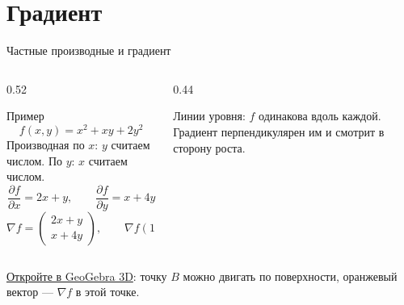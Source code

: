 \section{Градиент}

\begin{frame}[c,fragile]{Частные производные и градиент}
  \begin{columns}[T]
    \begin{column}{0.52\textwidth}
      \begin{block}{Пример}
        \small
        \[f(x, y) = x^2 + xy + 2y^2\]
        Производная по $x$: $y$ считаем числом. По $y$: $x$ считаем числом.
        \[\frac{\partial f}{\partial x} = 2x + y, \qquad \frac{\partial f}{\partial y} = x + 4y\]
        \[\nabla f = \begin{pmatrix} 2x+y\\ x+4y\end{pmatrix},\qquad
          \nabla f(1, 1) = \begin{pmatrix} 3\\ 5\end{pmatrix}\]
      \end{block}
    \end{column}
    \begin{column}{0.44\textwidth}
      \centering

      \smallskip
      \footnotesize\color{acGray}Линии уровня: $f$ одинакова вдоль каждой.
      Градиент перпендикулярен им и смотрит в сторону роста.
    \end{column}
  \end{columns}

  \medskip
  {\footnotesize\color{acGray}\href{https://www.geogebra.org/3d?command=f(x,y)=x^2%2Bx*y%2B2*y^2%3BSetFilling(f,0.35)%3BB=Point(f)%3BSetCoords(B,1,1,4)%3BA=(x(B),y(B),0)%3Bg=Vector(B,B%2B(2x(B)%2By(B),x(B)%2B4y(B),0))%3BSetColor(g,%22Orange%22)%3BSetLineThickness(g,10)}{\textcolor{acMid}{Откройте в GeoGebra 3D}}:
  точку $B$ можно двигать по поверхности, оранжевый вектор --- $\nabla f$ в этой точке.\par}
\end{frame}

